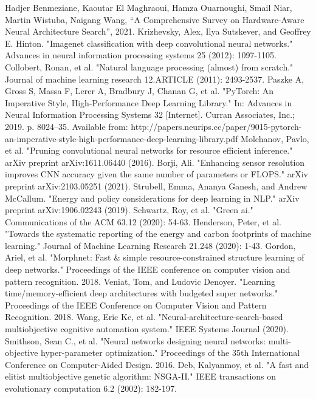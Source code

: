 \documentclass[conference]{IEEEtran}
\begin{document}
\begin{thebibliography}{00}
 Hadjer Benmeziane, Kaoutar El Maghraoui, Hamza Ouarnoughi, Smail Niar, Martin Wistuba, Naigang Wang, ``A Comprehensive Survey on Hardware-Aware Neural Architecture Search'', 2021.
 Krizhevsky, Alex, Ilya Sutskever, and Geoffrey E. Hinton. "Imagenet classification with deep convolutional neural networks." Advances in neural information processing systems 25 (2012): 1097-1105.
 Collobert, Ronan, et al. "Natural language processing (almost) from scratch." Journal of machine learning research 12.ARTICLE (2011): 2493-2537.
 Paszke A, Gross S, Massa F, Lerer A, Bradbury J, Chanan G, et al. "PyTorch: An Imperative Style, High-Performance Deep Learning Library." In: Advances in Neural Information Processing Systems 32 [Internet]. Curran Associates, Inc.; 2019. p. 8024–35. Available from: http://papers.neurips.cc/paper/9015-pytorch-an-imperative-style-high-performance-deep-learning-library.pdf
 Molchanov, Pavlo, et al. "Pruning convolutional neural networks for resource efficient inference." arXiv preprint arXiv:1611.06440 (2016).
 Borji, Ali. "Enhancing sensor resolution improves CNN accuracy given the same number of parameters or FLOPS." arXiv preprint arXiv:2103.05251 (2021).
 Strubell, Emma, Ananya Ganesh, and Andrew McCallum. "Energy and policy considerations for deep learning in NLP." arXiv preprint arXiv:1906.02243 (2019).
 Schwartz, Roy, et al. "Green ai." Communications of the ACM 63.12 (2020): 54-63.
 Henderson, Peter, et al. "Towards the systematic reporting of the energy and carbon footprints of machine learning." Journal of Machine Learning Research 21.248 (2020): 1-43.
 Gordon, Ariel, et al. "Morphnet: Fast \& simple resource-constrained structure learning of deep networks." Proceedings of the IEEE conference on computer vision and pattern recognition. 2018.
 Veniat, Tom, and Ludovic Denoyer. "Learning time/memory-efficient deep architectures with budgeted super networks." Proceedings of the IEEE Conference on Computer Vision and Pattern Recognition. 2018.
 Wang, Eric Ke, et al. "Neural-architecture-search-based multiobjective cognitive automation system." IEEE Systems Journal (2020).
 Smithson, Sean C., et al. "Neural networks designing neural networks: multi-objective hyper-parameter optimization." Proceedings of the 35th International Conference on Computer-Aided Design. 2016.
 Deb, Kalyanmoy, et al. "A fast and elitist multiobjective genetic algorithm: NSGA-II." IEEE transactions on evolutionary computation 6.2 (2002): 182-197.

\end{thebibliography}
\end{document}
